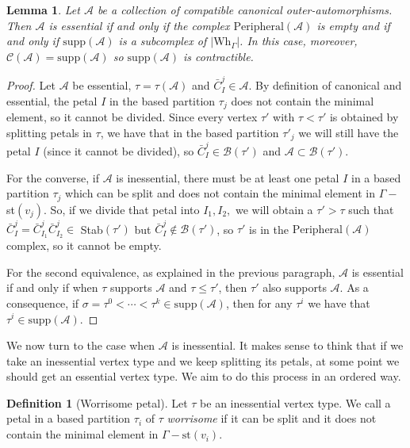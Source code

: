 \documentclass[a4paper]{amsart}
\newcommand{\G}{\Gamma}
\newcommand{\B}{\mathcal{B}}
\newcommand{\au}{\mathcal{A}}
\newcommand{\C}{\mathcal{C}}
\newcommand{\Wh}{\mathrm{Wh}}
\newcommand{\st}{\mathrm{st}}
\newcommand{\supp}{\mathrm{supp}}
\newcommand{\peria}{\mathrm{Peripheral}(\au)}
\newtheorem{lem}[teo]{Lemma}
\theoremstyle{definition}
\newtheorem{defi}[teo]{Definition}
\theoremstyle{remark}
\begin{document}
\begin{lem}
    Let $\au$ be a collection of compatible canonical outer-automorphisms. Then $\au$ is essential if and only if the complex $\peria$  is empty and if and only if $\supp(\au)$ is a subcomplex of $|\Wh_\G|$. In this case, moreover, $\C(\au)=\supp(\au)$ so $\supp(\au)$ is contractible. \label{lem:EssentialCharact}
\end{lem}
\begin{proof}
    Let $\au$ be essential, $\tau=\tau(\au)$ and $\bar{C}_{I}^j\in\au$. By definition of canonical and essential, the petal  $I$ in the based partition $\tau_j$ does not contain the minimal element, so it cannot be divided. Since every vertex $\tau'$ with $\tau<\tau'$ is obtained by splitting petals in $\tau$, we have that in the based partition $\tau'_j$ we will still have the petal  $I$ (since it cannot be divided), so $\bar{C}_{I}^j\in\B(\tau')$ and $\au\subset\B(\tau')$.

    For the converse, if $\au$ is inessential, there must be at least one petal $I$ in a based partition $\tau_j$  which can be split and does not contain the minimal element in $\G-$st$(v_j)$. So, if we divide that petal into $I_1, I_2,$ we will obtain a $\tau'>\tau$ such that $\bar{C}_{I}^j=\bar{C}_{I_1}^j\bar{C}_{I_2}^j\in$ Stab$(\tau')$ but $\bar{C}_{I}^j\notin\B(\tau')$, so $\tau'$ is in the $\peria$ complex, so it cannot be empty.

    For the second equivalence, as explained in the previous paragraph, $\au$ is essential if and only if when $\tau$ supports $\mathcal{A}$ and $\tau\leq \tau'$, then $\tau'$ also supports $\mathcal{A}$. As a consequence, if $\sigma=\tau^0<\cdots<\tau^k\in\supp(\au)$, then for any $\tau^i$ we have that $\tau^i\in\supp(\au)$.
\end{proof}



We now turn to the case when $\mathcal{A}$ is inessential. It makes sense to think that if we take an inessential vertex type and we keep splitting its petals, at some point we should get  an essential vertex type. We aim to do this process in an ordered way.

\begin{defi}[Worrisome petal]
    Let   $\tau$ be an inessential vertex type. We call a petal in a based partition $\tau_i$ of $\tau$  {\sl worrisome} if it can be split and it does not contain the minimal element in $\G-\st(v_i)$. \label{def:worri}
\end{defi}  
\end{document}
